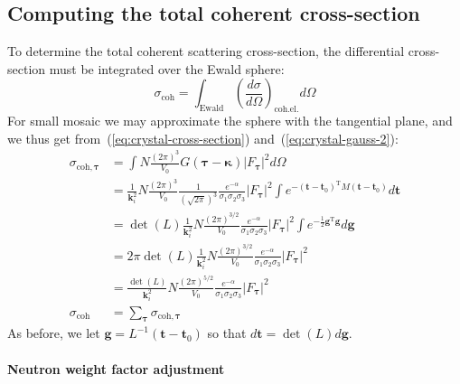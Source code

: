\subsection{Computing the total coherent cross-section}

To determine the total coherent scattering cross-section, the differential
cross-section must be integrated over the Ewald sphere:
$$
\sigma_\textrm{coh} = \int_\textrm{Ewald}
\left(\frac{d\sigma}{d\Omega}\right)_\textrm{coh.el.} d\Omega
$$
For small mosaic we may approximate the sphere with the tangential
plane, and we thus get from~(\ref{eq:crystal-cross-section})
and~(\ref{eq:crystal-gauss-2}):
\begin{equation}
  \label{eq:crystal-coh-cs}
  \begin{aligned}
  \sigma_{\textrm{coh},\boldsymbol{\tau}} &=  \int N\frac{(2\pi)^3}{V_0}
        G(\boldsymbol{\tau} - \boldsymbol{\kappa})
         |F_{\boldsymbol{\tau}}|^2 d\Omega  \\
  &=  \frac{1}{\boldsymbol{k}_i^2} N\frac{(2\pi)^3}{V_0}
         \frac{1}{(\sqrt{2\pi})^3}\frac{e^{-\alpha}}{\sigma_1\sigma_2\sigma_3}
         |F_{\boldsymbol{\tau}}|^2
         \int e^{-(\boldsymbol{t}-\boldsymbol{t}_0)^\textrm{T} M
         (\boldsymbol{t}-\boldsymbol{t}_0)}
         d\boldsymbol{t}  \\
  &=  \det(L) \frac{1}{\boldsymbol{k}_i^2} N\frac{(2\pi)^{3/2}}{V_0}
         \frac{e^{-\alpha}}{\sigma_1\sigma_2\sigma_3}
         |F_{\boldsymbol{\tau}}|^2
         \int e^{-\frac{1}{2}\boldsymbol{g}^\textrm{T}\boldsymbol{g}}
         d\boldsymbol{g}  \\
  &=  2\pi\det(L) \frac{1}{\boldsymbol{k}_i^2} N\frac{(2\pi)^{3/2}}{V_0}
         \frac{e^{-\alpha}}{\sigma_1\sigma_2\sigma_3}
         |F_{\boldsymbol{\tau}}|^2  \\
  &=  \frac{\det(L)}{\boldsymbol{k}_i^2} N\frac{(2\pi)^{5/2}}{V_0}
         \frac{e^{-\alpha}}{\sigma_1\sigma_2\sigma_3}
         |F_{\boldsymbol{\tau}}|^2  \\
  \sigma_\textrm{coh} &=  \sum_{\boldsymbol{\tau}} \sigma_{\textrm{coh},\boldsymbol{\tau}}
  \end{aligned}
\end{equation}
As before, we let $\boldsymbol{g} = L^{-1}(\boldsymbol{t} -
\boldsymbol{t}_0)$ so that $d\boldsymbol{t} = \det(L) d\boldsymbol{g}$.

\paragraph{Neutron weight factor adjustment}

